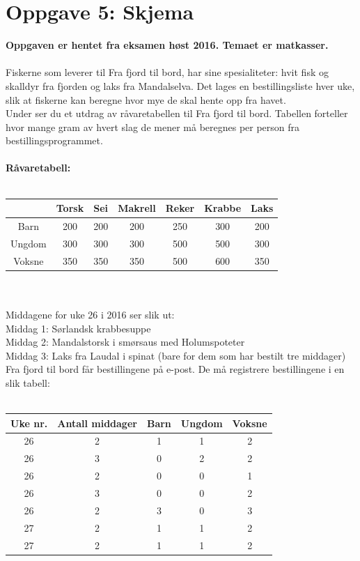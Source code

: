 \documentclass[a4paper, norsk, 10pt]{article}
\begin{document}
\section*{Oppgave 5: Skjema}
\textbf{Oppgaven er hentet fra eksamen høst 2016. Temaet er matkasser.}\\
\ \\
Fiskerne som leverer til Fra fjord til bord, har sine spesialiteter: hvit fisk og skalldyr fra fjorden og laks fra Mandalselva. Det lages en bestillingsliste hver uke, slik at fiskerne kan beregne hvor mye de skal hente opp fra havet.\\
Under ser du et utdrag av råvaretabellen til Fra fjord til bord. Tabellen forteller hvor mange gram av hvert slag de mener må beregnes per person fra bestillingsprogrammet.\\
\ \\
\textbf{Råvaretabell:}\\
\ \\
\begin{tabular}{ c | c | c | c | c | c | c }
& \textbf{Torsk} & \textbf{Sei} & \textbf{Makrell} & \textbf{Reker} & \textbf{Krabbe} & \textbf{Laks} \\
\hline
Barn & 200 & 200 & 200 & 250 & 300 & 200 \\
Ungdom & 300 & 300 & 300 & 500 & 500 & 300 \\
Voksne & 350 & 350 & 350 & 500 & 600 & 350 \\
\end{tabular}
\ \\
\ \\
Middagene for uke 26 i 2016 ser slik ut:\\
Middag 1: Sørlandsk krabbesuppe \\
Middag 2: Mandalstorsk i smørsaus med Holumspoteter \\
Middag 3: Laks fra Laudal i spinat (bare for dem som har bestilt tre middager)\\
Fra fjord til bord får bestillingene på e-post. De må registrere bestillingene i en slik tabell:\\
\ \\
\begin{tabular}{ c | c | c | c | c  }
\textbf{Uke nr.} & \textbf{Antall middager} &  \textbf{Barn} &  \textbf{Ungdom} &  \textbf{Voksne} \\
\hline
26 & 2 & 1 & 1 & 2\\
26 & 3 & 0 & 2 & 2 \\
26 & 2 & 0 & 0 & 1 \\
26 & 3 & 0 & 0 & 2 \\
26 & 2 & 3 & 0 & 3 \\
27 & 2 & 1 & 1 & 2 \\
27 & 2 & 1 & 1 & 2 \\
\end{tabular}
\end{document}
